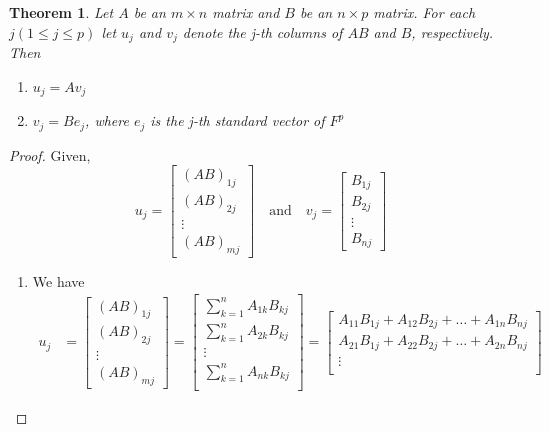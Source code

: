\documentclass[12pt, a4paper]{article}
\newtheorem{theorem}{Theorem}[section]
\theoremstyle{definition}
\theoremstyle{remark}
\begin{document}
\begin{theorem}
    Let $A$ be an $m \times n$ matrix and $B$ be an $n \times p$ matrix. For each $j(1 \le j \le p)$ let $u_j$ and $v_j$ denote the j-th columns of $AB$ and $B$, respectively. Then
    \begin{enumerate}
        \item $u_j = Av_j$
        \item $v_j = Be_j$, where $e_j$ is the j-th standard vector of $F^p$
    \end{enumerate}
\end{theorem}

\begin{proof}
    Given,
    \[
    u_j = \begin{bmatrix}
        (AB)_{1j} \\ (AB)_{2j} \\ \vdots \\ (AB)_{mj}
    \end{bmatrix} \quad \text{and} \quad 
    v_j = \begin{bmatrix}
        B_{1j} \\ B_{2j} \\ \vdots \\ B_{nj}
    \end{bmatrix}
    \]
    \begin{enumerate}
        \item We have
        \begin{align*}
        u_j &= \begin{bmatrix}
            (AB)_{1j} \\ (AB)_{2j} \\ \vdots \\ (AB)_{mj}
        \end{bmatrix} = \begin{bmatrix}
            \displaystyle\sum_{k=1}^n A_{1k}B_{kj} \\
            \displaystyle\sum_{k=1}^n A_{2k}B_{kj} \\
            \vdots \\
            \displaystyle\sum_{k=1}^n A_{nk}B_{kj} \\
        \end{bmatrix} = \begin{bmatrix}
            A_{11}B_{1j}+A_{12}B_{2j}+\ldots+A_{1n}B_{nj} \\
            A_{21}B_{1j}+A_{22}B_{2j}+\ldots+A_{2n}B_{nj} \\
            \vdots \\

\end{bmatrix}
\end{align*}
\end{enumerate}
\end{proof}
\end{document}
